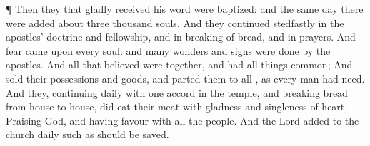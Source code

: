 {\par }{\PP {}¶
Then
they
that
gladly
received
his
word were
baptized:
and the
same
day there were
added
{}
about three
thousand
souls.
And they continued
stedfastly
in the
apostles’
doctrine
and
fellowship,
and in
breaking of
bread,
and in
prayers.
And
fear came
upon
every
soul:
and
many
wonders
and
signs were
done
by the
apostles.
And
all that
believed
were
together,
and
had all
things
common;
And sold
their
possessions
and
goods,
and
parted
them to
all
{},
as
every
man
had
need.
And they,
continuing
daily with one
accord
in the
temple,
and
breaking
bread from
house to
house, did eat
their
meat
with
gladness
and
singleness of
heart,
Praising
God,
and
having
favour
with
all the
people.
And the
Lord
added to the
church
daily
such
as should be
saved.

}
